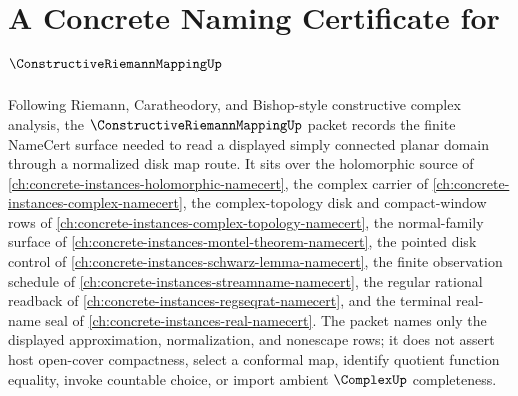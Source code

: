 \chapter{A Concrete Naming Certificate for $\ConstructiveRiemannMappingUp$}
\label{ch:concrete-instances-constructive-riemann-mapping-namecert}

Following Riemann, Caratheodory, and Bishop-style constructive complex analysis, the $\ConstructiveRiemannMappingUp$ packet records the finite NameCert surface needed to read a displayed simply connected planar domain through a normalized disk map route. It sits over the holomorphic source of \autoref{ch:concrete-instances-holomorphic-namecert}, the complex carrier of \autoref{ch:concrete-instances-complex-namecert}, the complex-topology disk and compact-window rows of \autoref{ch:concrete-instances-complex-topology-namecert}, the normal-family surface of \autoref{ch:concrete-instances-montel-theorem-namecert}, the pointed disk control of \autoref{ch:concrete-instances-schwarz-lemma-namecert}, the finite observation schedule of \autoref{ch:concrete-instances-streamname-namecert}, the regular rational readback of \autoref{ch:concrete-instances-regseqrat-namecert}, and the terminal real-name seal of \autoref{ch:concrete-instances-real-namecert}. The packet names only the displayed approximation, normalization, and nonescape rows; it does not assert host open-cover compactness, select a conformal map, identify quotient function equality, invoke countable choice, or import ambient $\ComplexUp$ completeness.

